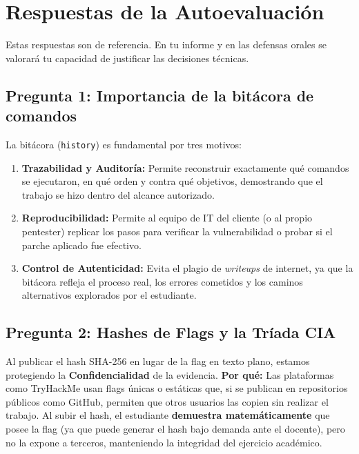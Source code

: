 \documentclass[11pt,a4paper]{article}
\begin{document}
\section{Respuestas de la Autoevaluación}\label{sec:respuestas}

\begin{clave}
Estas respuestas son de referencia. En tu informe y en las defensas orales se valorará tu capacidad de justificar las decisiones técnicas.
\end{clave}

\subsection*{Pregunta 1: Importancia de la bitácora de comandos}
\begin{respuesta}
La bitácora (\texttt{history}) es fundamental por tres motivos:
\begin{enumerate}
  \item \textbf{Trazabilidad y Auditoría:} Permite reconstruir exactamente qué comandos se ejecutaron, en qué orden y contra qué objetivos, demostrando que el trabajo se hizo dentro del alcance autorizado.
  \item \textbf{Reproducibilidad:} Permite al equipo de IT del cliente (o al propio pentester) replicar los pasos para verificar la vulnerabilidad o probar si el parche aplicado fue efectivo.
  \item \textbf{Control de Autenticidad:} Evita el plagio de \textit{writeups} de internet, ya que la bitácora refleja el proceso real, los errores cometidos y los caminos alternativos explorados por el estudiante.
\end{enumerate}
\end{respuesta}

\subsection*{Pregunta 2: Hashes de Flags y la Tríada CIA}
\begin{respuesta}
Al publicar el hash SHA-256 en lugar de la flag en texto plano, estamos protegiendo la \textbf{Confidencialidad} de la evidencia.
\textbf{Por qué:} Las plataformas como TryHackMe usan flags únicas o estáticas que, si se publican en repositorios públicos como GitHub, permiten que otros usuarios las copien sin realizar el trabajo. Al subir el hash, el estudiante \textbf{demuestra matemáticamente} que posee la flag (ya que puede generar el hash bajo demanda ante el docente), pero no la expone a terceros, manteniendo la integridad del ejercicio académico.
\end{respuesta}
\end{document}
